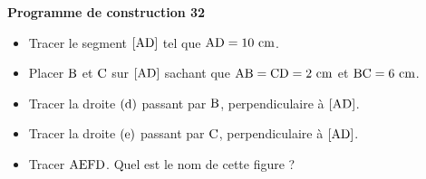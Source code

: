 \documentclass[exercice,a4]{thedocument}%
\begin{document}
%
\noindent\textbf{Programme de construction 32}\par\smallskip\noindent
\begin{itemize}
    \item Tracer le segment $[\text{AD}]$ tel que
    $\text{AD}=10\text{ cm}$.
    \item Placer $\text{B}$ et $\text{C}$ sur
    $[\text{AD}]$ sachant que
    $\text{AB}=\text{CD}=2\text{ cm}$ et
    $\text{BC}=6\text{ cm}$.
    \item Tracer la droite $(\text{d})$ passant par
    $\text{B}$, perpendiculaire à $[\text{AD}]$.
    \item Tracer la droite $(\text{e})$ passant par
    $\text{C}$, perpendiculaire à $[\text{AD}]$.
    \item Tracer $\text{AEFD}$. Quel est le nom de cette figure ?
\end{itemize}
\end{document}
